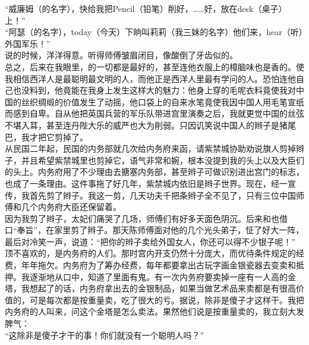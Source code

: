 “威廉姆（的名字），快给我把Pencil（铅笔）削好，……好，放在desk（桌子）上！”\\

“阿瑟（的名字），today（今天）下晌叫莉莉（我三妹的名字）他们来，hear（听）外国军乐！”\\

说的时候，洋洋得意。听得师傅皱眉闭目，像酸倒了牙齿似的。\\

总之，后来在我眼里，的一切都是最好的，甚至连他衣服上的樟脑味也是香的。使我相信西洋人是最聪明最文明的人，而他正是西洋人里最有学问的人。恐怕连他自己也没料到，他竟能在我身上发生这样大的魅力：他身上穿的毛呢衣料竟使我对中国的丝织绸缎的价值发生了动摇，他口袋上的自来水笔竟使我因中国人用毛笔宣纸而感到自卑。自从他把英国兵营的军乐队带进宫里演奏之后，我就更觉中国的丝弦不堪入耳，甚至连丹陛大乐的威严也大为削弱。只因讥笑说中国人的辫子是猪尾巴，我才把它剪掉了。\\

从民国二年起，民国的内务部就几次给内务府来函，请紫禁城协助劝说旗人剪掉辫子，并且希望紫禁城里也剪掉它，语气非常和婉，根本没提到我的头上以及大臣们的头上。内务府用了不少理由去搪塞内务部，甚至辫子可做识别进出宫门的标志，也成了一条理由。这件事拖了好几年，紫禁城内依旧是辫子世界。现在，经一宣传，我首先剪了辫子。我这一剪，几天功夫千把条辫子全不见了，只有三位中国师傅和几个内务府大臣还保留着。\\

因为我剪了辫子，太妃们痛哭了几场，师傅们有好多天面色阴沉。后来和也借口“奉旨”，在家里剪了辫子。那天陈师傅面对他的几个光头弟子，怔了好大一阵，最后对冷笑一声，说道：“把你的辫子卖给外国女人，你还可以得不少银子呢！”\\

顶不喜欢的，是内务府的人们。那时宫内开支仍然十分庞大，而优待条件规定的经费，年年拖欠。内务府为了筹办经费，每年都要拿出古玩字画金银瓷器去变卖和抵押。我逐渐地从口中，知道了里面有鬼。有一次内务府要卖掉一座有一人高的金塔，我想起了的话，内务府拿出去的金银制品，如果当做艺术品来卖都是有很高价值的，可是每次都是按重量卖，吃了很大的亏。据说，除非是傻子才这样干。我把内务府的人叫来，问这个金塔是怎么卖法。果然他们说是按重量卖的，我立刻大发脾气：\\

“这除非是傻子才干的事！你们就没有一个聪明人吗？”\\

